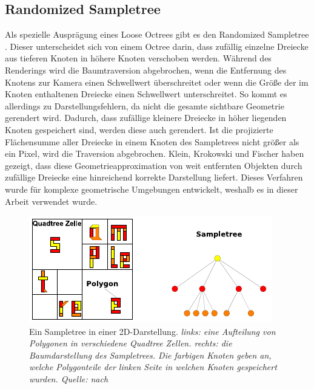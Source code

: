 \subsection{Randomized Sampletree}
\label{sec:basics:sampletree}
Als spezielle Ausprägung eines Loose Octrees gibt es den Randomized Sampletree \cite{klein}. Dieser unterscheidet sich von einem Octree darin, dass zufällig einzelne Dreiecke aus tieferen Knoten in höhere Knoten verschoben werden. Während des Renderings wird die Baumtraversion abgebrochen, wenn die Entfernung des Knotens zur Kamera einen Schwellwert überschreitet oder wenn die Größe der im Knoten enthaltenen Dreiecke einen Schwellwert unterschreitet. So kommt es allerdings zu Darstellungsfehlern, da nicht die gesamte sichtbare Geometrie gerendert wird. Dadurch, dass zufällige kleinere Dreiecke in höher liegenden Knoten gespeichert sind, werden diese auch gerendert. Ist die projizierte Flächensumme aller Dreiecke in einem Knoten des Sampletrees nicht größer als ein Pixel, wird die Traversion abgebrochen. Klein, Krokowski und Fischer \cite{klein} haben gezeigt, dass diese Geometrieapproximation von weit entfernten Objekten durch zufällige Dreiecke eine hinreichend korrekte Darstellung liefert. Dieses Verfahren wurde für komplexe geometrische Umgebungen entwickelt, weshalb es in dieser Arbeit verwendet wurde.
\begin{figure}
 \centering
  \includegraphics[scale=1.7]{images/sampletree2.pdf}
  \caption{Ein Sampletree in einer 2D-Darstellung. \textit{links: eine Aufteilung von Polygonen in verschiedene Quadtree Zellen. rechts: die Baumdarstellung des Sampletrees. Die farbigen Knoten geben an, welche Polygonteile der linken Seite in welchen Knoten gespeichert wurden. Quelle: nach \cite{klein}}}
 \label{fig:basics:sampletree}
\end{figure}

